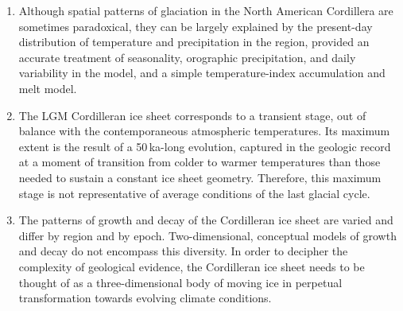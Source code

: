 \documentclass{article}
\begin{document}
\begin{enumerate}

\item Although spatial patterns of glaciation in the North American Cordillera
are sometimes paradoxical, they can be largely explained by the present-day
distribution of temperature and precipitation in the region, provided an
accurate treatment of seasonality, orographic precipitation, and daily
variability in the model, and a simple temperature-index accumulation and melt
model.

\item The LGM Cordilleran ice sheet corresponds to a transient stage, out of
balance with the contemporaneous atmospheric temperatures. Its maximum extent
is the result of a 50\,ka-long evolution, captured in the geologic record at a
moment of transition from colder to warmer temperatures than those needed to
sustain a constant ice sheet geometry. Therefore, this maximum stage is not
representative of average conditions of the last glacial cycle.

\item The patterns of growth and decay of the Cordilleran ice sheet are varied
and differ by region and by epoch. Two-dimensional, conceptual models of growth
and decay \citep[e.g.][]{Fulton.1991, Margold.etal.2013a} do not encompass this
diversity. In order to decipher the complexity of geological evidence, the
Cordilleran ice sheet needs to be thought of as a three-dimensional body of
moving ice in perpetual transformation towards evolving climate conditions.

\end{enumerate}


\renewcommand{\urlprefix}[0]{}  %



\end{document}
